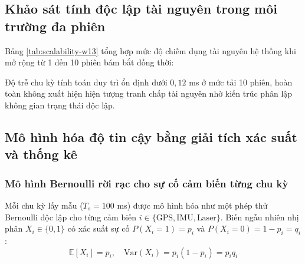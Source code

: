 \subsection{Khảo sát tính độc lập tài nguyên trong môi trường đa phiên}

\hspace{0.5cm} Bảng \ref{tab:scalability-w13} tổng hợp mức độ chiếm dụng tài nguyên hệ thống khi mở rộng từ 1 đến 10 phiên bám bắt đồng thời:

\begin{table}[H]
\centering
\caption{Khảo sát độ trễ tính toán và tài nguyên hệ thống theo số phiên đồng thời}
\label{tab:scalability-w13}
\end{table}

Độ trễ chu kỳ tính toán duy trì ổn định dưới $0{,}12$ ms ở mức tải 10 phiên, hoàn toàn không xuất hiện hiện tượng tranh chấp tài nguyên nhờ kiến trúc phân lập không gian trạng thái độc lập.

\subsection{Mô hình hóa độ tin cậy bằng giải tích xác suất và thống kê}

\subsubsection{Mô hình Bernoulli rời rạc cho sự cố cảm biến từng chu kỳ}

\hspace{0.5cm} Mỗi chu kỳ lấy mẫu ($T_s = 100$ ms) được mô hình hóa như một phép thử Bernoulli độc lập cho từng cảm biến $i \in \{\text{GPS}, \text{IMU}, \text{Laser}\}$. Biến ngẫu nhiên nhị phân $X_i \in \{0, 1\}$ có xác suất sự cố $P(X_i = 1) = p_i$ và $P(X_i = 0) = 1 - p_i = q_i$:
\begin{equation}
\mathbb{E}[X_i] = p_i, \quad \text{Var}(X_i) = p_i (1 - p_i) = p_i q_i
\label{eq:bernoulli-moments-w13}
\end{equation}

